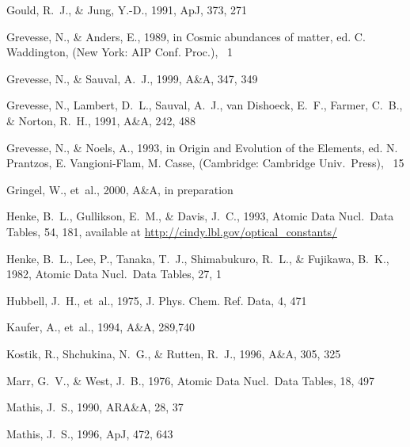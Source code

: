 \documentclass{aastex}
\begin{document}
\begin{thebibliography}{}
Gould, R.~J., \& Jung, Y.-D.,  1991, ApJ, 373, 271

Grevesse, N., \& Anders, E.,  1989,
\newblock in Cosmic abundances of matter, ed. C. Waddington,  (New York: AIP
  Conf. Proc.), ~1

  Grevesse, N., \& Sauval, A.~J., 1999, A\&A, 347, 349

Grevesse, N., Lambert, D.~L., Sauval, A.~J., {van Dishoeck}, E.~F., Farmer,
  C.~B., \& Norton, R.~H.,  1991, A\&A, 242, 488

Grevesse, N., \& Noels, A.,  1993,
\newblock in Origin and Evolution of the Elements, ed. N. Prantzos, E.
  Vangioni-Flam, M. Casse,  (Cambridge: Cambridge Univ.\ Press), ~15

Gringel, W., et~al., 2000, A\&A,
\newblock in preparation

Henke, B.~L., Gullikson, E.~M., \& Davis, J.~C.,  1993, Atomic Data Nucl.\ Data
  Tables, 54, 181,
\newblock available at \url{http://cindy.lbl.gov/optical\_constants/}

Henke, B.~L., Lee, P., Tanaka, T.~J., Shimabukuro, R.~L., \& Fujikawa, B.~K.,
  1982, Atomic Data Nucl.\ Data Tables, 27, 1

Hubbell, J.~H., et~al., 1975, J. Phys. Chem. Ref. Data, 4, 471

Kaufer, A., et~al., 1994, A\&A, 289,740

Kostik, R., Shchukina, N.~G., \& Rutten, R.~J.,  1996, A\&A, 305, 325

Marr, G.~V., \& West, J.~B.,  1976, Atomic Data Nucl.\ Data Tables, 18, 497

{Mathis}, J.~S.,  1990, ARA\&A, 28, 37

Mathis, J.~S.,  1996, ApJ, 472, 643


\end{thebibliography}
\end{document}
